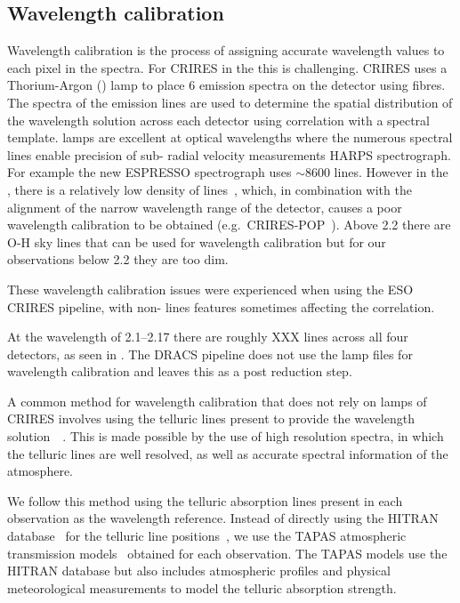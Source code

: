 \subsection{Wavelength calibration}
\label{subsec:wavecalib}

Wavelength calibration is the process of assigning accurate wavelength values to each pixel in the spectra. For {CRIRES} in the \nir{} this is challenging.
{CRIRES} uses a Thorium-Argon (\thar) lamp to place 6 emission spectra on the detector using fibres.
The spectra of the \thar{} emission lines are used to determine the spatial distribution of the wavelength solution across each detector using correlation with a spectral template.
\thar{} lamps are excellent at optical wavelengths where the numerous spectral lines enable precision of sub-\mps{} radial velocity measurements HARPS spectrograph. For example the new ESPRESSO spectrograph uses \(\sim8600\) \thar{} lines.
However in the \nir{}, there is a relatively low density of \thar{} lines~\citep{kerber_laboratory_2009}, which, in combination with the alignment of the narrow wavelength range of the detector, causes a poor wavelength calibration to be obtained (e.g.\ {CRIRES}-POP~\citep{nicholls_crirespop_2017}).
Above 2.2\um{} there are {O-H} sky lines that can be used for wavelength calibration but for our observations below 2.2\um{} they are too dim.

These wavelength calibration issues were experienced when using the {ESO} {CRIRES} pipeline, with non-\thar{} lines features sometimes affecting the correlation.

At the wavelength of 2.1--2.17\um{} there are roughly XXX \thar{} lines across all four detectors, as seen in .
The {DRACS} pipeline does not use the \thar{} lamp files for wavelength calibration and leaves this as a post reduction step.

A common method for wavelength calibration that does not rely on \thar{} lamps of {CRIRES} involves using the telluric lines present to provide the wavelength solution~\citep[e.g.][]{brogi_signature_2012,brogi_carbon_2014,dekok_detection_2013}{\red{}~\citep{piskorz_evidence_2016}}.
This is made possible by the use of high resolution spectra, in which the telluric lines are well resolved, as well as accurate spectral information of the atmosphere.

We follow this method using the telluric absorption lines present in each observation as the wavelength reference. Instead of directly using the {HITRAN} database~\citep{rothman_hitran2012_2013} for the telluric line positions~\citet[such as in][]{brogi_signature_2012,brogi_carbon_2014,dekok_detection_2013}, we use the {TAPAS} atmospheric transmission models~\citep{bertaux_tapas_2014} obtained for each observation. The {TAPAS} models use the {HITRAN} database but also includes atmospheric profiles and physical meteorological measurements to model the telluric absorption strength.

